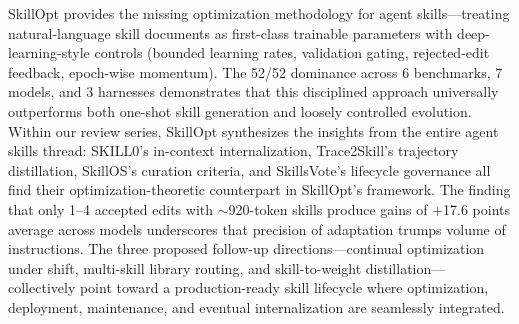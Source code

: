 \documentclass[11pt,a4paper]{article}
\begin{document}
SkillOpt provides the missing optimization methodology for agent skills---treating natural-language skill documents as first-class trainable parameters with deep-learning-style controls (bounded learning rates, validation gating, rejected-edit feedback, epoch-wise momentum). The 52/52 dominance across 6 benchmarks, 7 models, and 3 harnesses demonstrates that this disciplined approach universally outperforms both one-shot skill generation and loosely controlled evolution. Within our review series, SkillOpt synthesizes the insights from the entire agent skills thread: SKILL0's in-context internalization, Trace2Skill's trajectory distillation, SkillOS's curation criteria, and SkillsVote's lifecycle governance all find their optimization-theoretic counterpart in SkillOpt's framework. The finding that only 1--4 accepted edits with $\sim$920-token skills produce gains of +17.6 points average across models underscores that precision of adaptation trumps volume of instructions. The three proposed follow-up directions---continual optimization under shift, multi-skill library routing, and skill-to-weight distillation---collectively point toward a production-ready skill lifecycle where optimization, deployment, maintenance, and eventual internalization are seamlessly integrated.
\end{document}
